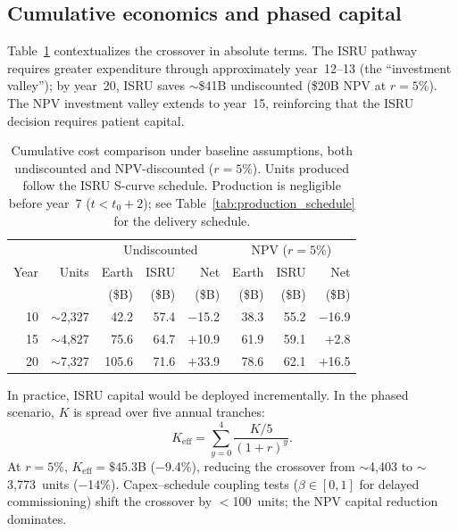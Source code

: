 \documentclass[preprint,12pt]{elsarticle}
\begin{document}
\subsection{Cumulative economics and phased capital}
\label{sec:phased_capital}

Table~\ref{tab:cumulative} contextualizes the crossover in absolute terms. The ISRU pathway requires greater expenditure through approximately year~12--13 (the ``investment valley''); by year~20, ISRU saves $\sim$\$41B undiscounted (\$20B NPV at $r = 5\%$). The NPV investment valley extends to year~15, reinforcing that the ISRU decision requires patient capital.

\begin{table}[htbp]
\centering
\caption{Cumulative cost comparison under baseline assumptions, both undiscounted and NPV-discounted ($r = 5\%$). Units produced follow the ISRU S-curve schedule. Production is negligible before year~7 ($t < t_0 + 2$); see Table~\ref{tab:production_schedule} for the delivery schedule.}
\label{tab:cumulative}
\begin{tabular}{@{}rr|rrr|rrr@{}}
\toprule
 & & \multicolumn{3}{c|}{Undiscounted} & \multicolumn{3}{c}{NPV ($r = 5\%$)} \\
Year & Units & Earth & ISRU & Net & Earth & ISRU & Net \\
 & & (\$B) & (\$B) & (\$B) & (\$B) & (\$B) & (\$B) \\
\midrule
10 & $\sim$2{,}327 & 42.2  & 57.4   & $-$15.2 & 38.3  & 55.2  & $-$16.9 \\
15 & $\sim$4{,}827 & 75.6  & 64.7   & $+$10.9 & 61.9  & 59.1  & $+$2.8  \\
20 & $\sim$7{,}327 & 105.6 & 71.6   & $+$33.9 & 78.6  & 62.1  & $+$16.5 \\
\bottomrule
\end{tabular}
\end{table}

In practice, ISRU capital would be deployed incrementally. In the phased scenario, $K$ is spread over five annual tranches:
\begin{equation}
  K_{\mathrm{eff}} = \sum_{y=0}^{4} \frac{K/5}{(1+r)^y}.
  \label{eq:phased_capital}
\end{equation}
At $r = 5\%$, $K_{\mathrm{eff}} = \$45.3$B ($-$9.4\%), reducing the crossover from $\sim$4{,}403 to $\sim$3{,}773~units ($-$14\%). Capex--schedule coupling tests ($\beta \in [0, 1]$ for delayed commissioning) shift the crossover by $<$100~units; the NPV capital reduction dominates.
\end{document}
